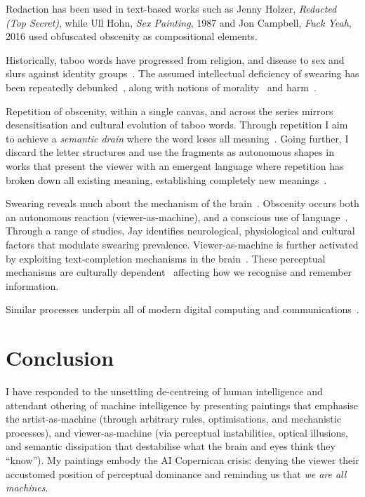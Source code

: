 \documentclass[12pt]{article}
\begin{document}
Redaction has been used in text-based works such as Jenny Holzer,
\emph{Redacted (Top Secret)}, while Ull Hohn, \emph{Sex Painting},
1987 and Jon Campbell, \emph{Fuck Yeah}, 2016 used obfuscated obscenity
as compositional elements.

Historically, taboo words have progressed from religion, and disease
to sex and slurs against identity
groups~\cite{douglas1966purity,pinker2008seven,mcwhorter2024nine}. The
assumed intellectual deficiency of swearing has been repeatedly
debunked~\cite{reiman2022swearfluency,jay2015taboo}, along with
notions of morality~\cite{pinker2017moral,devries2023swearing} and
harm~\cite{jay2009offensive}.

Repetition of obscenity, within a single canvas, and across the series
mirrors desensitisation and cultural evolution of taboo words.
Through repetition I aim to achieve a \emph{semantic drain} where the
word loses all
meaning~\cite{barthes1957mythologies,derrida1972dissemination}. Going
further, I discard the letter structures and use the fragments as
autonomous shapes in works that present the viewer with an emergent
language where repetition has broken down all existing meaning,
establishing completely new
meanings~\cite{derrida1972dissemination,deleuze1968difference,baudrillard1981simulacra}.

Swearing reveals much about the mechanism of the
brain~\cite{bergen2018what}. Obscenity occurs both an autonomous
reaction (viewer-as-machine), and a conscious use of
language~\cite{jay1999why}.  Through a range of studies, Jay
identifies neurological, physiological and cultural factors that
modulate swearing prevalence. Viewer-as-machine is further activated
by exploiting text-completion mechanisms in the
brain~\cite{Taylor1953,Reicher1969,Healy1976,GraingerWhitney2004,CohenDehaene2000,Levy2008}. These
perceptual mechanisms are culturally
dependent~\cite{Bartlett1932,Hall1976,ChuaBolandNisbett2005,MasudaNisbett2001}
affecting how we recognise and remember information.

Similar processes underpin all of modern digital computing and
communications~\cite{shannon1948}.

\section{Conclusion}
I have responded to the unsettling de-centreing of human intelligence
and attendant othering of machine intelligence by presenting paintings
that emphasise the artist-as-machine (through arbitrary rules,
optimisations, and mechanistic processes), and viewer-as-machine (via
perceptual instabilities, optical illusions, and semantic dissipation
that destabilise what the brain and eyes think they ``know''). My
paintings embody the AI Copernican crisis: denying the viewer their
accustomed position of perceptual dominance and reminding us that
\emph{we are all machines}.
\end{document}
